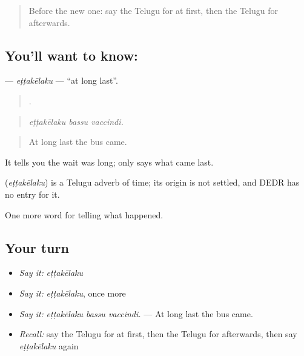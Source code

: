 \label{lesson:TE-C328-ettakelaku}



\begin{quote}
Before the new one: say the Telugu for at first, then the Telugu for afterwards.
\end{quote}

\subsection*{You'll want to know: }
\textbf{} — \emph{eṭṭakēlaku} — \textquotedblleft{}at long last\textquotedblright{}.

\begin{quote}
  .
\end{quote}

\begin{quote}
\emph{eṭṭakēlaku bassu vaccindi.}
\end{quote}

\begin{quote}
At long last the bus came.
\end{quote}

It tells you the wait was long;  only says what came last.

\begin{cousinweb}
\textbf{} (\emph{eṭṭakēlaku}) is a Telugu adverb of time; its origin is not settled, and DEDR has no entry for it.
\end{cousinweb}

\begin{grammarlens}[title={What you've built}]
One more word for telling what happened.
\end{grammarlens}

\subsection*{Your turn}
\begin{itemize}
\raggedright
  \item \emph{Say it:} \emph{eṭṭakēlaku}
  \item \emph{Say it:} \emph{eṭṭakēlaku}, once more
  \item \emph{Say it:} \emph{eṭṭakēlaku bassu vaccindi.} — At long last the bus came.
  \item \emph{Recall:} say the Telugu for at first, then the Telugu for afterwards, then say \emph{eṭṭakēlaku} again
\end{itemize}

